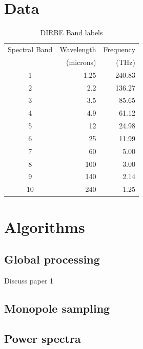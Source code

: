 \documentclass{aa}
\begin{document}
\section{Data}
\label{sec:data}

 \begin{table}
\caption{DIRBE Band labels}              %
\label{table:1}      %
\centering                                      %
\begin{tabular}{c r r}          %
\hline\hline                        %
Spectral Band & Wavelength 
	& Frequency \\    %
 & (microns) & (THz) \\
\hline                                   %
	1 & 1.25  & 240.83\\      %
	2 & 2.2   & 136.27\\
	3 & 3.5   & 85.65\\
	4 & 4.9   & 61.12\\
	5 & 12    & 24.98\\
	6 & 25    & 11.99\\
	7 & 60    & 5.00 \\
	8 & 100   & 3.00 \\
	9 & 140   & 2.14 \\
	10 & 240  & 1.25\\
\hline                                             %
\end{tabular}
\end{table}

\section{Algorithms}
\label{sec:algo}

\subsection{Global processing}

Discuss paper 1

\subsection{Monopole sampling}

\subsection{Power spectra}
\end{document}
